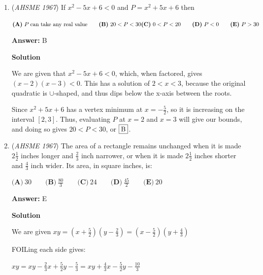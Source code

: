 \begin{enumerate}
 \textbf{Answer: }A



\textbf{Solution}

We are given that the roots are real, so the discriminant is positive, which means $p^2 - 4(8)(1) > 0$.  This leads to $|p| > 4\sqrt{2}$.  By Vieta, the sum of the roots is $-p$, so we have $|-(r_1 + r_2)| \ge 4\sqrt{2}$, or $|r_1 + r_2| > 4\sqrt{2}$, which is option $\fbox{A}$.

 


	\item (\textit{AHSME 1967}) If $x^2-5x+6<0$ and $P=x^2+5x+6$ then


 $\textbf{(A)}\ P \; \text{can take any real value} \qquad \textbf{(B)}\ 20<P<30\\ \textbf{(C)}\ 0<P<20 \qquad \textbf{(D)}\ P<0 \qquad \textbf{(E)}\ P>30$

 \textbf{Answer: }B



\textbf{Solution}

We are given that $x^2 - 5x + 6 < 0$, which, when factored, gives $(x - 2)(x-3) < 0$.  This has a solution of $2<x<3$, because the original quadratic is $\cup$-shaped, and thus dips below the x-axis between the roots.

 Since $x^2 + 5x + 6$ has a vertex minimum at $x = -\frac{5}{2}$, so it is increasing on the interval $[2, 3]$.  Thus, evaluating $P$ at $x=2$ and $x=3$ will give our bounds, and doing so gives $20 < P < 30$, or $\fbox{B}$.

 


	\item (\textit{AHSME 1967}) The area of a rectangle remains unchanged when it is made $2 \frac{1}{2}$ inches longer and $\frac{2}{3}$ inch narrower, or when it is made $2 \frac{1}{2}$ inches shorter and $\frac{4}{3}$ inch wider.  Its area, in square inches, is:


 $\textbf{(A)}\ 30\qquad \textbf{(B)}\ \frac{80}{3}\qquad \textbf{(C)}\ 24\qquad \textbf{(D)}\ \frac{45}{2}\qquad \textbf{(E)}\ 20$

 \textbf{Answer: }E



\textbf{Solution}

We are given $xy = (x+\frac{5}{2})(y-\frac{2}{3}) = (x - \frac{5}{2})(y + \frac{4}{3})$

 FOILing each side gives:

 $xy = xy - \frac{2}{3}x + \frac{5}{2}y - \frac{5}{3} = xy + \frac{4}{3}x - \frac{5}{2}y - \frac{10}{3}$


\end{enumerate}
